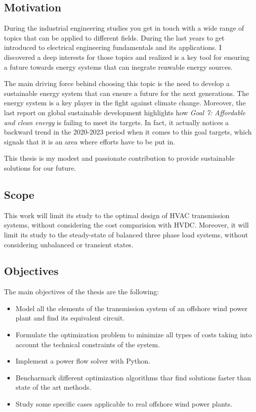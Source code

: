 \documentclass[a4paper,11pt, titlepage, twoside]{article}
\begin{document}
\subsection{Motivation}

During the industrial engineering studies you get in touch with a wide range of topics that can be applied
to different fields. During the last years to get introduced to electrical engineering fundamentals and its 
applications. I discovered a deep interests for those topics and realized is a key tool for ensuring a future towards
energy systems that can inegrate renwable energy sources.\par

The main driving force behind choosing this topic is the need to develop a sustainable energy system that can
ensure a future for the next generations. The energy system is a key player in the fight against climate change. Moreover, the last
report on global sustainable development \cite{SustGoal7} highlights how \textit{Goal 7: Affordable and clean energy} is failing to meet its targets.
In fact, it actually notices a backward trend in the 2020-2023 period when it comes to this goal targets, which signals that it is an area where efforts
have to be put in. \par

This thesis is my modest and passionate contribution to provide sustainable solutions for our future.

\subsection{Scope}

This work will limit its study to the optimal design of HVAC transmission systems, without considering the cost comparision with
HVDC.  Moreover, it will limit its study to the steady-state of balanced three phase load systems, without considering unbalanced or transient states.
\subsection{Objectives}

The main objectives of the thesis are the following:
\begin{itemize}
    \item Model all the elements of the transmission system of an offshore wind power plant and find its equivalent circuit.
    \item Formulate the optimization problem to minimize all types of costs taking into account the technical constraints of the system.
    \item Implement a power flow solver with Python.
    \item Bencharmark different optimization algorithms thar find solutions faster than state of the art methods.
    \item Study some specific cases applicable to real offshore wind power plants.
  \end{itemize}
\end{document}
